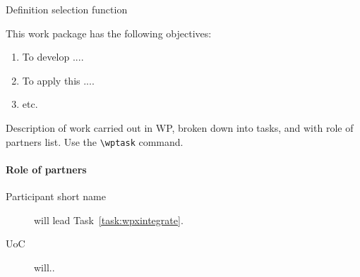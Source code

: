 \begin{workpackage}{Definition selection function}
  \label{wpx:title}

  \makewptable %

  \begin{wpobjectives}
    This work package has the following objectives:
    \begin{enumerate}
      \item To develop ....
      \item To apply this ....
      \item etc.
    \end{enumerate}
  \end{wpobjectives}

  \begin{wpdescription}

    Description of work carried out in WP, broken down into tasks, and
    with role of partners list. Use the \texttt{\textbackslash wptask} command.


    \paragraph{Role of partners}
    \begin{description}
      \item[Participant short name] will lead Task~\ref{task:wpxintegrate}.
      \item[UoC] will..
    \end{description}
  \end{wpdescription}

  \begin{wpdeliverables}

    \label{dev:wpxspecs}

    \label{dev:wpximplementation}

    \label{dev:wpxprototype}

  \end{wpdeliverables}

\end{workpackage}


